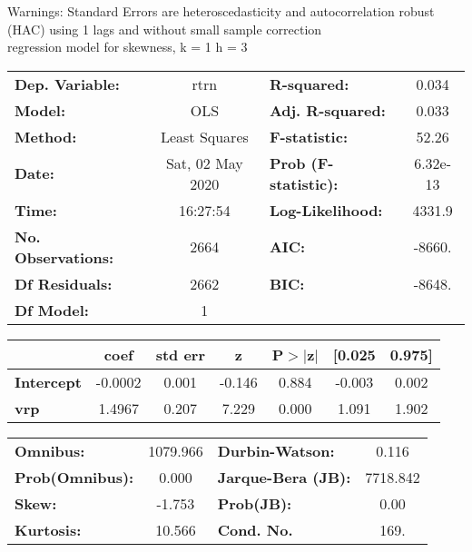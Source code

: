 Warnings: \newline
 [1] Standard Errors are heteroscedasticity and autocorrelation robust (HAC) using 1 lags and without small sample correction\\ 

regression model for skewness, k = 1 h = 3\begin{center}
\begin{tabular}{lclc}
\toprule
\textbf{Dep. Variable:}    &       rtrn       & \textbf{  R-squared:         } &     0.034   \\
\textbf{Model:}            &       OLS        & \textbf{  Adj. R-squared:    } &     0.033   \\
\textbf{Method:}           &  Least Squares   & \textbf{  F-statistic:       } &     52.26   \\
\textbf{Date:}             & Sat, 02 May 2020 & \textbf{  Prob (F-statistic):} &  6.32e-13   \\
\textbf{Time:}             &     16:27:54     & \textbf{  Log-Likelihood:    } &    4331.9   \\
\textbf{No. Observations:} &        2664      & \textbf{  AIC:               } &    -8660.   \\
\textbf{Df Residuals:}     &        2662      & \textbf{  BIC:               } &    -8648.   \\
\textbf{Df Model:}         &           1      & \textbf{                     } &             \\
\bottomrule
\end{tabular}
\begin{tabular}{lcccccc}
                   & \textbf{coef} & \textbf{std err} & \textbf{z} & \textbf{P$> |$z$|$} & \textbf{[0.025} & \textbf{0.975]}  \\
\midrule
\textbf{Intercept} &      -0.0002  &        0.001     &    -0.146  &         0.884        &       -0.003    &        0.002     \\
\textbf{vrp}       &       1.4967  &        0.207     &     7.229  &         0.000        &        1.091    &        1.902     \\
\bottomrule
\end{tabular}
\begin{tabular}{lclc}
\textbf{Omnibus:}       & 1079.966 & \textbf{  Durbin-Watson:     } &    0.116  \\
\textbf{Prob(Omnibus):} &   0.000  & \textbf{  Jarque-Bera (JB):  } & 7718.842  \\
\textbf{Skew:}          &  -1.753  & \textbf{  Prob(JB):          } &     0.00  \\
\textbf{Kurtosis:}      &  10.566  & \textbf{  Cond. No.          } &     169.  \\
\bottomrule
\end{tabular}
\end{center}

